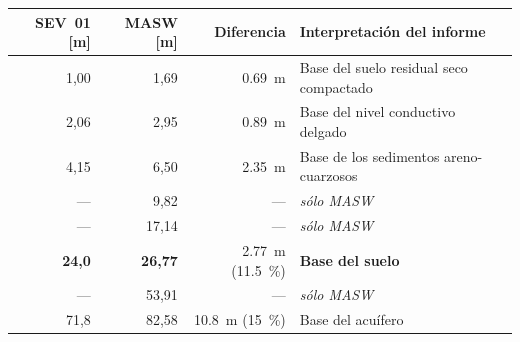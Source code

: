 \begin{center}\footnotesize
\begin{tabular}{@{}rrrl@{}}
\toprule
SEV~01 [\si{\meter}] & MASW [\si{\meter}] & Diferencia & Interpretaci\'on del informe \\
\midrule
1{,}00 & 1{,}69 & \SI{0.69}{\meter} & Base del suelo residual seco compactado \\
2{,}06 & 2{,}95 & \SI{0.89}{\meter} & Base del nivel conductivo delgado \\
4{,}15 & 6{,}50 & \SI{2.35}{\meter} & Base de los sedimentos areno-cuarzosos \\
--- & 9{,}82 & --- & \textit{s\'olo MASW} \\
--- & 17{,}14 & --- & \textit{s\'olo MASW} \\
\textbf{24{,}0} & \textbf{26{,}77} & \SI{2.77}{\meter} (\SI{11.5}{\percent}) & \textbf{Base del suelo} \\
--- & 53{,}91 & --- & \textit{s\'olo MASW} \\
71{,}8 & 82{,}58 & \SI{10.8}{\meter} (\SI{15}{\percent}) & Base del acu\'ifero \\
\bottomrule
\end{tabular}
\end{center}



